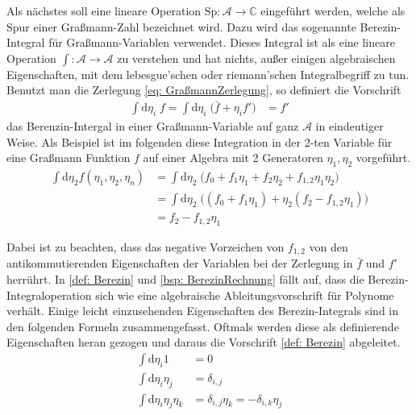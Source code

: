 Als nächstes soll eine lineare Operation $\mathrm{Sp}:\mathcal A \rightarrow \mathbb C$ eingeführt werden, welche als Spur einer Graßmann-Zahl bezeichnet wird. Dazu wird das sogenannte Berezin-Integral für Graßmann-Variablen verwendet. Dieses Integral ist als eine lineare Operation $\int: \mathcal A \rightarrow \mathcal A$ zu verstehen und hat nichts, außer einigen algebraischen Eigenschaften, mit dem lebesgue'schen oder riemann'schen Integralbegriff zu tun. Benutzt man die Zerlegung \eqref{eq: GraßmannZerlegung}, so definiert die Vorschrift 
\begin{align} 
\int \mathrm{d} \eta_i \; f = \int \mathrm{d} \eta_i \; \bigg(\bar{f} + \eta_i f'\bigg) &= f' \label{def: Berezin}
\end{align}
das Berenzin-Intergal in einer Graßmann-Variable auf ganz $\mathcal A$ in eindeutiger Weise. Als Beispiel ist im folgenden diese Integration in der 2-ten Variable für eine Graßmann Funktion $f$ auf einer Algebra mit 2 Generatoren $\eta_1, \eta_2$ vorgeführt.
\begin{align} 
\int \mathrm{d}\eta_2 f(\eta_1,\eta_2,\eta_n) &= \int \mathrm{d}\eta_2 \; \bigg( f_0 + f_1 \eta_1 + f_2 \eta_2 + f_{1,2} \eta_1 \eta_2  \bigg) \nonumber \\
&= \int \mathrm{d}\eta_2 \; \bigg( (f_0 + f_1 \eta_1) + \eta_2 (f_2  - f_{1,2} \eta_1) \bigg) \nonumber\\
&= f_2  - f_{1,2} \eta_1 \label{bsp: BerezinRechnung}
\end{align}

\noindent Dabei ist zu beachten, dass das negative Vorzeichen von $f_{1,2}$ von den antikommutierenden Eigenschaften der Variablen bei der Zerlegung in $\bar f$ und  $f'$ herrührt. In \eqref{def: Berezin} und \eqref{bsp: BerezinRechnung} fällt auf, dass die Berezin-Integraloperation sich wie eine algebraische Ableitungsvorschrift für Polynome verhält. Einige leicht einzusehenden Eigenschaften des Berezin-Integrals sind in den folgenden Formeln zusammengefasst. Oftmals werden diese als definierende Eigenschaften heran gezogen und daraus die Vorschrift \eqref{def: Berezin} abgeleitet. 
\begin{align}
    \int \mathrm{d}\eta_i 1 &= 0 \label{eq: Berezin1}\\
    \int \mathrm{d}\eta_i \eta_j &= \delta_{i,j} \\
    \int \mathrm{d}\eta_i \eta_j \eta_k &=  \delta_{i,j} \eta_k = - \delta_{i,k} \eta_j \label{eq: Berezin3}
\end{align}

